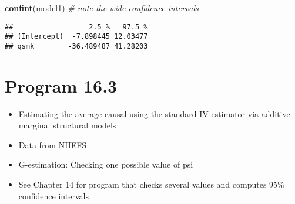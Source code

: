 \documentclass[10pt,]{book}
\newenvironment{Shaded}{\begin{snugshade}}{\end{snugshade}}
\newcommand{\CommentTok}[1]{\textcolor[rgb]{0.56,0.35,0.01}{\textit{#1}}}
\newcommand{\DataTypeTok}[1]{\textcolor[rgb]{0.13,0.29,0.53}{#1}}
\newcommand{\DecValTok}[1]{\textcolor[rgb]{0.00,0.00,0.81}{#1}}
\newcommand{\FloatTok}[1]{\textcolor[rgb]{0.00,0.00,0.81}{#1}}
\newcommand{\KeywordTok}[1]{\textcolor[rgb]{0.13,0.29,0.53}{\textbf{#1}}}
\newcommand{\NormalTok}[1]{#1}
\newcommand{\OperatorTok}[1]{\textcolor[rgb]{0.81,0.36,0.00}{\textbf{#1}}}
\newcommand{\StringTok}[1]{\textcolor[rgb]{0.31,0.60,0.02}{#1}}
\begin{document}
\begin{Shaded}
\begin{Highlighting}[]
\KeywordTok{confint}\NormalTok{(model1)  }\CommentTok{# note the wide confidence intervals}
\end{Highlighting}
\end{Shaded}

\begin{verbatim}
##                  2.5 %   97.5 %
## (Intercept)  -7.898445 12.03477
## qsmk        -36.489487 41.28203
\end{verbatim}

\hypertarget{program-16.3}{%
\section{Program 16.3}\label{program-16.3}}

\begin{itemize}
\item
  Estimating the average causal using the standard IV estimator via additive marginal structural models
\item
  Data from NHEFS
\item
  G-estimation: Checking one possible value of psi\\
\item
  See Chapter 14 for program that checks several values and computes 95\% confidence intervals
\end{itemize}

\begin{Shaded}
\end{Shaded}
\end{document}
